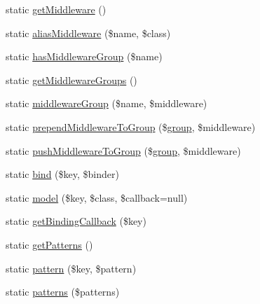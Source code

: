 \begin{DoxyCompactItemize}
\item 
static \mbox{\hyperlink{class_illuminate_1_1_support_1_1_facades_1_1_route_ac8cd393a47c3e27405e140e0b143aec8}{get\+Middleware}} ()
\item 
static \mbox{\hyperlink{class_illuminate_1_1_support_1_1_facades_1_1_route_a2303469c734df3248247dc66ec3e6b4f}{alias\+Middleware}} (\$name, \$class)
\item 
static \mbox{\hyperlink{class_illuminate_1_1_support_1_1_facades_1_1_route_abf3af941c9614b377ce6d798aaa671a6}{has\+Middleware\+Group}} (\$name)
\item 
static \mbox{\hyperlink{class_illuminate_1_1_support_1_1_facades_1_1_route_a8124e67845527e8c6550543b9859561f}{get\+Middleware\+Groups}} ()
\item 
static \mbox{\hyperlink{class_illuminate_1_1_support_1_1_facades_1_1_route_adc46eb120062bf3a3488ed866b868a63}{middleware\+Group}} (\$name, \$middleware)
\item 
static \mbox{\hyperlink{class_illuminate_1_1_support_1_1_facades_1_1_route_a18c9e3d1b6ee2af7b94f2aa2265c0c5c}{prepend\+Middleware\+To\+Group}} (\$\mbox{\hyperlink{class_illuminate_1_1_support_1_1_facades_1_1_route_ac33b88549eeaaed8325ee4b479a8c132}{group}}, \$middleware)
\item 
static \mbox{\hyperlink{class_illuminate_1_1_support_1_1_facades_1_1_route_a5ed4aa5fc4f06f149321abd0671f2176}{push\+Middleware\+To\+Group}} (\$\mbox{\hyperlink{class_illuminate_1_1_support_1_1_facades_1_1_route_ac33b88549eeaaed8325ee4b479a8c132}{group}}, \$middleware)
\item 
static \mbox{\hyperlink{class_illuminate_1_1_support_1_1_facades_1_1_route_aa8f9b61452dcd905b61494ea174d4956}{bind}} (\$key, \$binder)
\item 
static \mbox{\hyperlink{class_illuminate_1_1_support_1_1_facades_1_1_route_ac98c5b1745935107addfb0fc224a696f}{model}} (\$key, \$class, \$callback=null)
\item 
static \mbox{\hyperlink{class_illuminate_1_1_support_1_1_facades_1_1_route_aa5e004b320250adff27b176fdc14f775}{get\+Binding\+Callback}} (\$key)
\item 
static \mbox{\hyperlink{class_illuminate_1_1_support_1_1_facades_1_1_route_a937714eb57fd5cdc4763873eb8f28e45}{get\+Patterns}} ()
\item 
static \mbox{\hyperlink{class_illuminate_1_1_support_1_1_facades_1_1_route_a8f488e142dfe7fb74ee7d07876627d98}{pattern}} (\$key, \$pattern)
\item 
static \mbox{\hyperlink{class_illuminate_1_1_support_1_1_facades_1_1_route_a5ffa318d86f489c77ed7e2ce757e0cd3}{patterns}} (\$patterns)

\end{DoxyCompactItemize}
